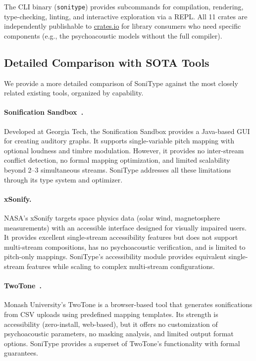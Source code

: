 \documentclass[sigchi, nonacm]{acmart}
\begin{document}
The CLI binary (\texttt{sonitype}) provides subcommands for compilation, rendering, type-checking, linting, and interactive exploration via a REPL. All 11 crates are independently publishable to \url{crates.io} for library consumers who need specific components (e.g., the psychoacoustic models without the full compiler).

\subsection{Detailed Comparison with SOTA Tools}
\label{sec:detailed_comparison}

We provide a more detailed comparison of SoniType against the most closely related existing tools, organized by capability.

\paragraph{Sonification Sandbox~\cite{walker2003sonificationsandbox}.} Developed at Georgia Tech, the Sonification Sandbox provides a Java-based GUI for creating auditory graphs. It supports single-variable pitch mapping with optional loudness and timbre modulation. However, it provides no inter-stream conflict detection, no formal mapping optimization, and limited scalability beyond 2--3 simultaneous streams. SoniType addresses all these limitations through its type system and optimizer.

\paragraph{xSonify.} NASA's xSonify targets space physics data (solar wind, magnetosphere measurements) with an accessible interface designed for visually impaired users. It provides excellent single-stream accessibility features but does not support multi-stream compositions, has no psychoacoustic verification, and is limited to pitch-only mappings. SoniType's accessibility module provides equivalent single-stream features while scaling to complex multi-stream configurations.

\paragraph{TwoTone~\cite{twotone2020}.} Monash University's TwoTone is a browser-based tool that generates sonifications from CSV uploads using predefined mapping templates. Its strength is accessibility (zero-install, web-based), but it offers no customization of psychoacoustic parameters, no masking analysis, and limited output format options. SoniType provides a superset of TwoTone's functionality with formal guarantees.
\end{document}
